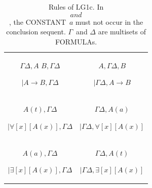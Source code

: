 \documentclass[10pt,a4paper]{article}
\newcommand*{\olup}[1]{\MakeUppercase{#1}}
\theoremstyle{plain}
\theoremstyle{definition}
\theoremstyle{remark}
\newcommand*{\ollabel}[1]{\label{#1}}
\providecommand{\RightLabel}[1]{}
\providecommand{\DisplayProof}{}
\providecommand{\fCenter}{}
\providecommand{\lif}{\mathbin{\rightarrow}}
\providecommand{\lforall}{\mathord{\forall}}
\providecommand{\lexists}{\mathord{\exists}}
\providecommand{\Log}{\ensuremath{\mathrm{L}}}
\providecommand{\LeftR}[1]{}
\providecommand{\RightR}[1]{}
\providecommand{\UnaryInf}{\ensuremath{\mid}}
\providecommand{\BinaryInf}{\ensuremath{\mid}}
\providecommand{\RightR}{\mathrm{R}}
\providecommand{\LeftR}{\mathrm{L}}
\providecommand{\Axiom}{\mathrm{Ax}}
\begin{document}
\begin{table}
\begin{tabular}{@{}c@{}c@{}}
\\[4ex]
\Axiom$ \Gamma \fCenter \Delta, A$
\Axiom$ B, \Gamma \fCenter \Delta$
\RightLabel{\LeftR{\lif}}
\BinaryInf$ A \lif B, \Gamma \fCenter \Delta$
\DisplayProof
&
\Axiom$ A, \Gamma \fCenter \Delta, B$
\RightLabel{\RightR{\lif}}
\UnaryInf$ \Gamma \fCenter \Delta, A \lif B $
\DisplayProof
\\[4ex]
\Axiom$ A(t), \Gamma \fCenter \Delta$
\RightLabel{\LeftR{\lforall}}
\UnaryInf$ \lforall[x][A(x)],\Gamma \fCenter \Delta$
\DisplayProof
&
\Axiom$ \Gamma \fCenter \Delta, A(a) $
\RightLabel{\RightR{\lforall}}
\UnaryInf$ \Gamma \fCenter \Delta, \lforall[x][A(x)]$
\DisplayProof
\\[4ex]
\Axiom$ A(a), \Gamma \fCenter \Delta $
\RightLabel{\LeftR{\lexists}}
\UnaryInf$ \lexists[x][A(x)], \Gamma \fCenter \Delta$
\DisplayProof
&
\Axiom$ \Gamma \fCenter \Delta, A(t) $
\RightLabel{\RightR{\lexists}}
\UnaryInf$ \Gamma \fCenter \Delta, \lexists[x][A(x)]$
\DisplayProof
\end{tabular}
\caption{Rules of \Log{G1c}. In $\RightR{\forall}$ and
$\LeftR{\exists}$, the \olup{constant}~$a$ must not occur in the
conclusion sequent. $\Gamma$~and $\Delta$ are
multisets of \olup{formula}s.}
\ollabel{tab:G1c}
\end{table}

\end{document}
